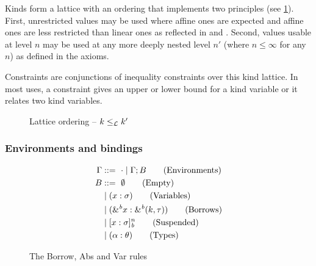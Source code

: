 Kinds form a lattice with an ordering that implements two principles
(see \cref{sdtyp:lattice}). First, unrestricted values may be used
where affine ones are expected and affine ones are less restricted
than linear ones as reflected in  and .
Second, values usable at level $n$ may be used at any more deeply
nested level $n'$ (where $n\le\infty$ for any $n$) as defined in the  axioms.

Constraints are conjunctions of inequality constraints over this kind
lattice. In most uses, a constraint gives an upper or lower bound for
a kind variable or it relates two kind variables.

\begin{figure*}[tp]
  
  \caption{Lattice ordering -- $k \leq_\mathcal L k'$}
  \label{sdtyp:lattice}
\end{figure*}


\subsubsection{Environments and bindings}
\label{sdtyping:envs}
\begin{figure*}[tp]
  \begin{minipage}{0.28\linewidth}
    \begin{align*}
      \Gamma &::=\ \cdot \mid \Gamma;B\tag{Environments}\\
      B &::=\ \emptyset \tag{Empty} \\
         &\mid (x : \sigma)\tag{Variables}\\
         &\mid ({\&}^{\textit{b}}x : {\&}^{\textit{b}}(k,\tau))\tag{Borrows}\\
         &\mid [x : \sigma]_{\textit{b}}^n \tag{Suspended}\\
         &\mid (\alpha : \theta)\tag{Types}
    \end{align*}
    \caption{Type environments}
    \label{grammar:env}
  \end{minipage}\hfill
  \begin{minipage}{0.7\linewidth}
    \caption{The {\sc Borrow}, {\sc Abs} and {\sc Var} rules}
    \label{selectrules:borrow}
    \label{selectrules:binders}
  \end{minipage}
\end{figure*}

